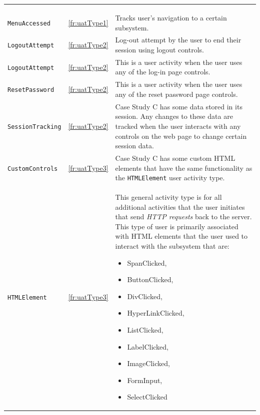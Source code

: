 \begin{xltabular}{\textwidth}{llX}
	\caption[Case Study A activity types]{\textit{Case Study A activity types}}\label{tbl:ch3_systemCActivityTypes}\\
	\toprule
	 &  &  \\
	\midrule
	\endfirsthead

	\caption[]{\continueCaption} \\
	\toprule
	 &  &  \\
	\midrule
	\endhead

	\midrule
	 \\ 
	\endfoot
	\endlastfoot

	\texttt{MenuAccessed} & \ref{fr:uatType1} & \RaggedRight Tracks user's navigation to a certain subsystem. \\ 
	\texttt{LogoutAttempt} & \ref{fr:uatType2} & \RaggedRight Log-out attempt by the user to end their session using logout controls. \\ 
	\texttt{LogoutAttempt} & \ref{fr:uatType2} & \RaggedRight This is a user activity when the user uses any of the log-in page controls. \\
	\texttt{ResetPassword} & \ref{fr:uatType2} & \RaggedRight This is a user activity when the user uses any of the reset password page controls. \\
	\texttt{SessionTracking} & \ref{fr:uatType2} & \RaggedRight Case Study C has some data stored in its session. Any changes to these data are tracked when the user interacts with any controls on the web page to change certain session data. \\
	\texttt{CustomControls} & \ref{fr:uatType3} & \RaggedRight Case Study C has some custom HTML elements that have the same functionality as the \texttt{HTMLElement} user activity type. \\ 
	\texttt{HTMLElement} & \ref{fr:uatType3} & \RaggedRight This general activity type is for all additional activities that the user initiates that send \textit{HTTP requests} back to the server. This type of user is primarily associated with HTML elements that the user used to interact with the subsystem that are: \begin{itemize}
		\item SpanClicked,
		\item ButtonClicked, 
		\item DivClicked, 
		\item HyperLinkClicked,
		\item ListClicked, 
		\item LabelClicked, 
		\item ImageClicked, 
		\item FormInput, 
		\item SelectClicked
	\end{itemize} \\
	\bottomrule
\end{xltabular}

